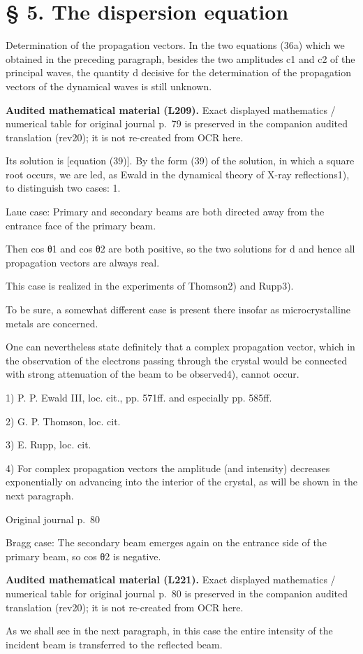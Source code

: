 \documentclass[10pt]{article}
\newcommand{\origpage}[1]{\par\medskip\noindent\hfill{\small\color{notegray}Original journal p.~#1}\hfill\mbox{}\par\smallskip}
\newcommand{\mathref}[2]{\par\smallskip\noindent\colorbox{gray!8}{\parbox{0.95\linewidth}{\small\color{notegray}\textbf{Audited mathematical material (L#1).} Exact displayed mathematics / numerical table for original journal p.~#2 is preserved in the companion audited translation (rev20); it is not re-created from OCR here.}}\par\smallskip}
\begin{document}
\section*{§ 5. The dispersion equation}
Determination of the propagation vectors. In the two equations (36a) which we obtained in the preceding paragraph, besides the two amplitudes c1 and c2 of the principal waves, the quantity d decisive for the determination of the propagation vectors of the dynamical waves is still unknown.\par
\mathref{209}{79}
Its solution is [equation (39)]. By the form (39) of the solution, in which a square root occurs, we are led, as Ewald in the dynamical theory of X-ray reflections1), to distinguish two cases: 1.\par
Laue case: Primary and secondary beams are both directed away from the entrance face of the primary beam.\par
Then cos θ1 and cos θ2 are both positive, so the two solutions for d and hence all propagation vectors are always real.\par
This case is realized in the experiments of Thomson2) and Rupp3).\par
To be sure, a somewhat different case is present there insofar as microcrystalline metals are concerned.\par
One can nevertheless state definitely that a complex propagation vector, which in the observation of the electrons passing through the crystal would be connected with strong attenuation of the beam to be observed4), cannot occur.\par
\noindent\footnotesize 1) P. P. Ewald III, loc. cit., pp. 571ff. and especially pp. 585ff.\par\normalsize
\noindent\footnotesize 2) G. P. Thomson, loc. cit.\par\normalsize
\noindent\footnotesize 3) E. Rupp, loc. cit.\par\normalsize
\noindent\footnotesize 4) For complex propagation vectors the amplitude (and intensity) decreases exponentially on advancing into the interior of the crystal, as will be shown in the next paragraph.\par\normalsize
\origpage{80}
Bragg case: The secondary beam emerges again on the entrance side of the primary beam, so cos θ2 is negative.\par
\mathref{221}{80}
As we shall see in the next paragraph, in this case the entire intensity of the incident beam is transferred to the reflected beam.\par
\end{document}
